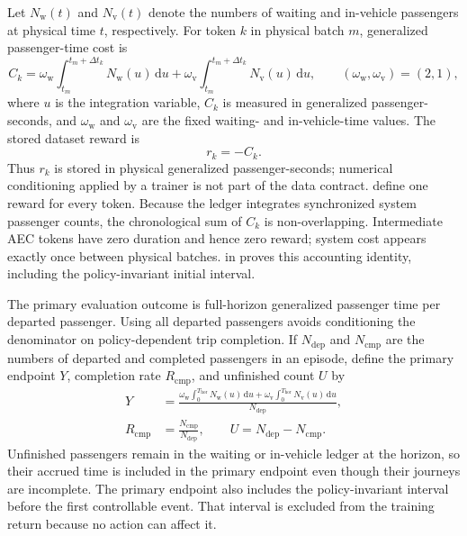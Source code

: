 Let $N_{\mathrm{w}}(t)$ and $N_{\mathrm{v}}(t)$ denote the numbers of waiting
and in-vehicle passengers at physical time $t$, respectively. For token $k$ in
physical batch $m$, generalized passenger-time cost is
\begin{equation}
C_k=
\omega_{\mathrm{w}}\int_{t_m}^{t_m+\Delta t_k}N_{\mathrm{w}}(u)\,\mathrm{d}u
+
\omega_{\mathrm{v}}\int_{t_m}^{t_m+\Delta t_k}N_{\mathrm{v}}(u)\,\mathrm{d}u,
\qquad
(\omega_{\mathrm{w}},\omega_{\mathrm{v}})=(2,1),
\label{eq:v7_cost}
\end{equation}
where $u$ is the integration variable, $C_k$ is measured in generalized
passenger-seconds, and
$\omega_{\mathrm{w}}$ and $\omega_{\mathrm{v}}$ are the fixed waiting- and
in-vehicle-time values. The stored dataset reward is
\begin{equation}
r_k=-C_k.
\label{eq:v7_reward}
\end{equation}
Thus $r_k$ is stored in physical generalized passenger-seconds; numerical
conditioning applied by a trainer is not part of the data contract.
 define one reward for every token. Because the ledger
integrates synchronized system passenger counts, the chronological sum of
$C_k$ is non-overlapping. Intermediate AEC tokens have zero duration and hence
zero reward; system cost appears exactly once between physical batches.
 in  proves this accounting
identity, including the policy-invariant initial interval.

The primary evaluation outcome is full-horizon generalized passenger time per
departed passenger. Using all departed passengers avoids conditioning the
denominator on policy-dependent trip completion. If $N_{\mathrm{dep}}$ and
$N_{\mathrm{cmp}}$ are the numbers of departed and completed passengers in an
episode, define the primary endpoint $Y$, completion rate $R_{\mathrm{cmp}}$,
and unfinished count $U$ by
\begin{equation}
\begin{aligned}
Y&=\frac{\omega_{\mathrm{w}}\int_0^{T_{\mathrm{hor}}}N_{\mathrm{w}}(u)\,\mathrm{d}u
       +\omega_{\mathrm{v}}\int_0^{T_{\mathrm{hor}}}N_{\mathrm{v}}(u)\,\mathrm{d}u}
      {N_{\mathrm{dep}}},\\
R_{\mathrm{cmp}}&=\frac{N_{\mathrm{cmp}}}{N_{\mathrm{dep}}},
\qquad U=N_{\mathrm{dep}}-N_{\mathrm{cmp}}.
\end{aligned}
\label{eq:completion_rate}
\end{equation}
Unfinished passengers remain in the waiting or in-vehicle ledger at the
horizon, so their accrued time is included in the primary endpoint even though
their journeys are incomplete. The primary endpoint also includes the
policy-invariant interval before the first controllable event. That interval is
excluded from the training return because no action can affect it.

